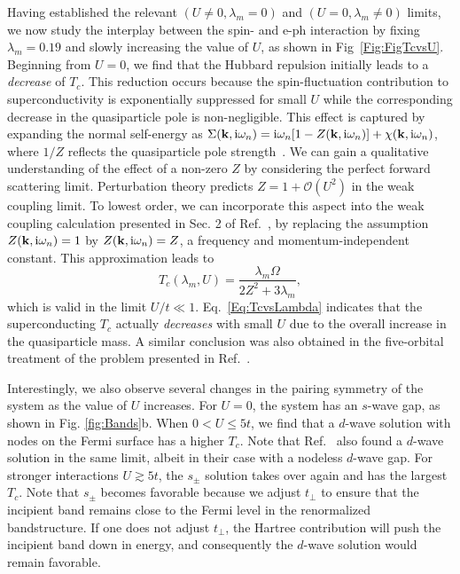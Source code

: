 \documentclass[%
 reprint,
 superscriptaddress,
nofootinbib,
nobibnotes,
 amsmath,amssymb,
 aps,
 prb,
 dvipsnames, 
 floatfix
]{revtex4-2}
\newcommand{\eph}{e-ph}
\begin{document}
Having established the relevant $(U \ne 0, \lambda_m = 0)$ and $(U = 0,\lambda_m \ne 0)$ limits, we now study the interplay between the spin- and {\eph} interaction 
by fixing $\lambda_m = 0.19$ and slowly increasing the value of $U$, as shown in Fig~\ref{Fig:FigTcvsU}. Beginning 
from $U = 0$, we find that the Hubbard repulsion initially leads to a {\em decrease} of $T_c$. This reduction occurs because the spin-fluctuation contribution to superconductivity is exponentially suppressed for small $U$ while the corresponding decrease in the quasiparticle pole is non-negligible. This effect is captured by expanding the normal self-energy as $\Sigma ({\bf k}, \mathrm{i} \omega_n) = \mathrm{i} \omega_n  [1 - Z({\bf k},\mathrm{i} \omega_n)] + \chi({\bf k},\mathrm{i} \omega_n)$, where $1/Z$ reflects the quasiparticle pole strength~\cite{Imada:1998er}. 
We can gain a qualitative understanding of the effect of a non-zero $Z$ by considering the perfect forward scattering limit. Perturbation theory predicts $Z = 1 + \mathcal{O}(U^2)$ in the weak coupling limit. To lowest order, we can incorporate this 
aspect into the weak coupling calculation presented in Sec. 2 of Ref.~\cite{Rademaker2016}, by replacing the assumption $Z({\bf k},\mathrm{i}\omega_n) = 1$ by $Z({\bf k},\mathrm{i}\omega_n) = Z$, a frequency and momentum-independent constant. This approximation leads to 
\begin{equation}
    T_c (\lambda_m,U) = \frac{\lambda_m\Omega}{2Z^2+3\lambda_m}, 
    \label{Eq:TcvsLambda}
\end{equation}
which is valid in the limit $U/t \ll 1$. Eq.~\eqref{Eq:TcvsLambda} indicates that the 
superconducting $T_c$ actually {\em decreases} with small $U$ due to the overall increase 
in the quasiparticle mass. A similar conclusion was also obtained in the five-orbital 
treatment of the problem presented in Ref.~\cite{Schrodi:2020bq}. 

Interestingly, we also observe several changes in the pairing symmetry of the system 
as the value of $U$ increases. For $U = 0$, the system 
has an $s$-wave gap, as shown in Fig. \ref{fig:Bands}b. 
When $0<U \le 5t$, we find that a $d$-wave solution with nodes on the Fermi surface has a higher $T_c$. Note that Ref.~\cite{Schrodi:2020bq} also found a $d$-wave solution in the same limit, albeit in their case with a nodeless $d$-wave gap. For stronger interactions $U\gtrsim 5t$, the $s_\pm$ solution takes over again and has the largest $T_c$. Note that $s_\pm$ becomes favorable because we adjust $t_\perp$ to ensure that the incipient band remains close to the Fermi level in the renormalized bandstructure. If one does not adjust $t_\perp$, the Hartree contribution will push the incipient band down in energy, and consequently the $d$-wave solution would remain favorable.
\end{document}
